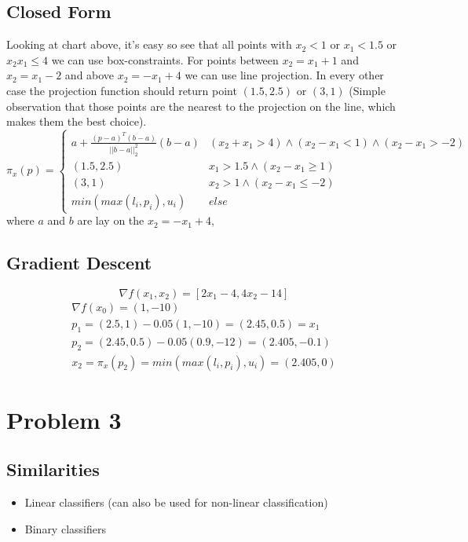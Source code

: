 \documentclass{article}
\def\gt{>}
\begin{document}
\subsection{Closed Form}
    Looking at chart above, it's easy so see that all points with $x_2 < 1$ or $x_1 < 1.5$ or $x_2 x_1 \leq 4$ we can 
    use box-constraints. For points between $x_2 = x_1 + 1$ and $x_2 = x_1 - 2$ and above $x_2 = -x_1 +4$ 
    we can use line projection. In every other case the projection function should return
    point $(1.5,2.5)$ or $(3,1)$ (Simple observation that those points are the nearest
    to the projection on the line, which makes them the best choice).\\


    \[ \pi_x(p) =  \begin{cases} 
        a+ \frac{(p-a)^T(b-a)}{||b-a||^2_2}(b-a)& (x_2+x_1 \gt 4) \land (x_2 - x_1 < 1) \land (x_2 - x_1 > -2)  \\
        (1.5,2.5) & x_1 > 1.5 \land (x_2 - x_1 \geq 1) \\
        (3,1) & x_2 > 1 \land (x_2 - x_1 \leq -2) \\
        min(max(l_i, p_i), u_i) & else 
     \end{cases}
    \]
    where $a$ and $b$ are lay on the $x_2 = -x_1 +4$,
\subsection{Gradient Descent}
\begin{equation}
    \nabla f(x_1,x_2) = [2x_1 - 4, 4x_2 -14]
\end{equation}
\begin{equation}
    \begin{gathered}
        \nabla f(x_0) = (1,-10) \\
        p_1 = (2.5,1) - 0.05(1,-10) = (2.45, 0.5) = x_1 \\
        p_2 = (2.45, 0.5) - 0.05(0.9, -12) = (2.405, -0.1) \\
        x_2 = \pi_x(p_2) = min(max(l_i, p_i), u_i) = (2.405, 0)
    \end{gathered}
\end{equation}
\section{Problem 3}
\subsection{Similarities}
\begin{itemize}
    \item Linear classifiers (can also be used for non-linear classification)
    \item Binary classifiers
\end{itemize}
\end{document}

